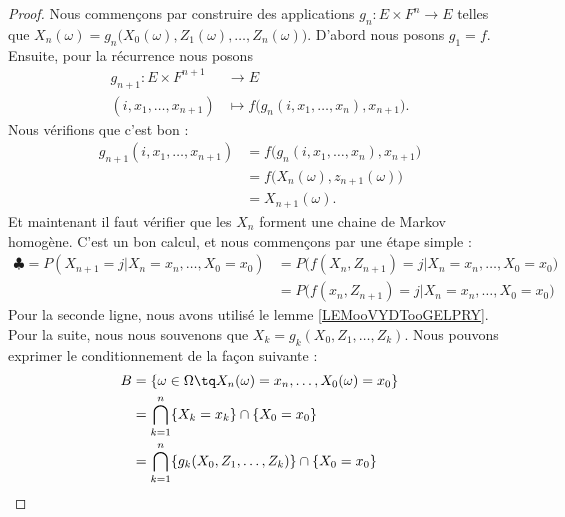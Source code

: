 \begin{proof}
    Nous commençons par construire des applications \( g_n\colon E\times F^n\to E\) telles que \( X_n(\omega)=g_n\big( X_0(\omega), Z_1(\omega),\ldots, Z_n(\omega) \big)\). D'abord nous posons \( g_1=f\). Ensuite, pour la récurrence nous posons
    \begin{equation}
        \begin{aligned}
            g_{n+1}\colon E\times F^{n+1}&\to E \\
            (i,x_1,\ldots, x_{n+1})&\mapsto f\big( g_n(i,x_1,\ldots, x_n), x_{n+1} \big). 
        \end{aligned}
    \end{equation}
    Nous vérifions que c'est bon :
    \begin{subequations}
        \begin{align}
            g_{n+1}(i,x_1,\ldots, x_{n+1})&= f\big( g_n(i,x_1,\ldots, x_n), x_{n+1} \big)\\
            &=f\big( X_n(\omega),z_{n+1}(\omega) \big)\\
            &=X_{n+1}(\omega).
        \end{align}
    \end{subequations}
    Et maintenant il faut vérifier que les \( X_n\) forment une chaine de Markov homogène. C'est un bon calcul, et nous commençons par une étape simple :
    \begin{subequations}
        \begin{align}
            \clubsuit=P(X_{n+1}=j|X_n=x_n,\ldots, X_0=x_0)&=P\big( f(X_n,Z_{n+1})=j|X_n=x_n,\ldots, X_0=x_0 \big)\\
            &=P\big( f(x_n,Z_{n+1})=j|X_n=x_n,\ldots, X_0=x_0 \big)  
        \end{align}
    \end{subequations}
    Pour la seconde ligne, nous avons utilisé le lemme \ref{LEMooVYDTooGELPRY}. Pour la suite, nous nous souvenons que \( X_k=g_k(X_0,Z_1,\ldots, Z_k)\). Nous pouvons exprimer le conditionnement de la façon suivante :
    \begin{subequations}
        \begin{align}
            B&=\{ \omega\in \Omega\tq X_n(\omega)=x_n,\ldots, X_0(\omega)=x_0 \}\\
            &=  \bigcap_{k=1}^n\{ X_k=x_k \}  \cap   \{ X_0=x_0 \}\\
            &=  \bigcap_{k=1}^n\{ g_k(X_0, Z_1,\ldots, Z_k) \}  \cap   \{ X_0=x_0 \}\\

\end{align}
\end{subequations}
\end{proof}
